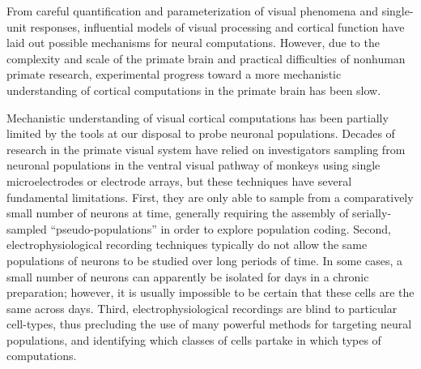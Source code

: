 
From careful quantification and parameterization of visual phenomena and single-unit responses, influential models of visual processing and cortical function have laid out possible mechanisms for neural computations\cite{Riesenhuber1999,Ferster2000,Carandini1994,Carandini2012,DiCarlo2012}. However, due to the complexity and scale of the primate brain and practical difficulties of nonhuman primate research, experimental progress toward a more mechanistic understanding of cortical computations in the primate brain has been slow.  

Mechanistic understanding of visual cortical computations has been partially limited by the tools at our disposal to probe neuronal populations. Decades of research in the primate visual system have relied on investigators sampling from neuronal populations in the ventral visual pathway of monkeys using single microelectrodes or electrode arrays, but these techniques have several fundamental limitations. First, they are only able to sample from a comparatively small number of neurons at time, generally requiring the assembly of serially-sampled ``pseudo-populations'' in order to explore population coding. Second, electrophysiological recording techniques typically do not allow the same populations of neurons to be studied over long periods of time. In some cases, a small number of neurons can apparently be isolated for days in a chronic preparation; however, it is usually impossible to be certain that these cells are the same across days. Third, electrophysiological recordings are blind to particular cell-types, thus precluding the use of many powerful methods for targeting neural populations, and identifying which classes of cells partake in which types of computations.

